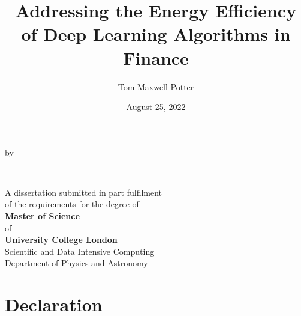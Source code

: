 \documentclass[a4paper, 11pt]{report}
\title{Addressing the Energy Efficiency of Deep Learning Algorithms in Finance}
\author{Tom Maxwell Potter}
\date{August 25, 2022}
\begin{document}
    \begin{titlepage}
        \begin{center}
            \vspace*{1cm}
            
            \vfill
            
            \makeatletter
            {\Huge\textbf{\@title}}

            \vspace{0.8cm}
            by
            \vspace{0.8cm}

            {\Large\textbf{\@author}}

            \vspace{1.5cm}
            {\textbf{\\\@date}}

            \vfill

            {A dissertation submitted in part fulfilment\\
            of the requirements for the degree of\\}
            {
            \textbf{Master of Science}\\
            of\\
            \textbf{University College London\\}}
            \vspace{1cm}
            {Scientific and Data Intensive Computing\\
            Department of Physics and Astronomy}

            \vspace{2cm}
        \end{center}
    \end{titlepage}


    \chapter*{Declaration}
    
\end{document}
